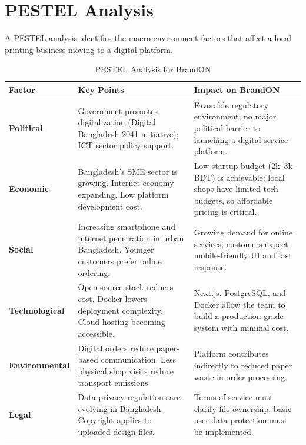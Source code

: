 \documentclass[12pt,a4paper]{report}
\begin{document}
\section{PESTEL Analysis}

A PESTEL analysis identifies the macro-environment factors that affect a local printing business moving to a digital platform.

\begin{table}[H]
  \centering
  \caption{PESTEL Analysis for BrandON}
  \begin{tabularx}{\textwidth}{L{2.2cm} X X}
    \toprule
    \textbf{Factor} & \textbf{Key Points} & \textbf{Impact on BrandON} \\
    \midrule
    \textbf{Political}
      & Government promotes digitalization (Digital Bangladesh 2041 initiative); ICT sector policy support.
      & Favorable regulatory environment; no major political barrier to launching a digital service platform. \\
    \midrule
    \textbf{Economic}
      & Bangladesh's SME sector is growing. Internet economy expanding. Low platform development cost.
      & Low startup budget (2k--3k BDT) is achievable; local shops have limited tech budgets, so affordable pricing is critical. \\
    \midrule
    \textbf{Social}
      & Increasing smartphone and internet penetration in urban Bangladesh. Younger customers prefer online ordering.
      & Growing demand for online services; customers expect mobile-friendly UI and fast response. \\
    \midrule
    \textbf{Technological}
      & Open-source stack reduces cost. Docker lowers deployment complexity. Cloud hosting becoming accessible.
      & Next.js, PostgreSQL, and Docker allow the team to build a production-grade system with minimal cost. \\
    \midrule
    \textbf{Environmental}
      & Digital orders reduce paper-based communication. Less physical shop visits reduce transport emissions.
      & Platform contributes indirectly to reduced paper waste in order processing. \\
    \midrule
    \textbf{Legal}
      & Data privacy regulations are evolving in Bangladesh. Copyright applies to uploaded design files.
      & Terms of service must clarify file ownership; basic user data protection must be implemented. \\
    \bottomrule
  \end{tabularx}
\end{table}
\end{document}
